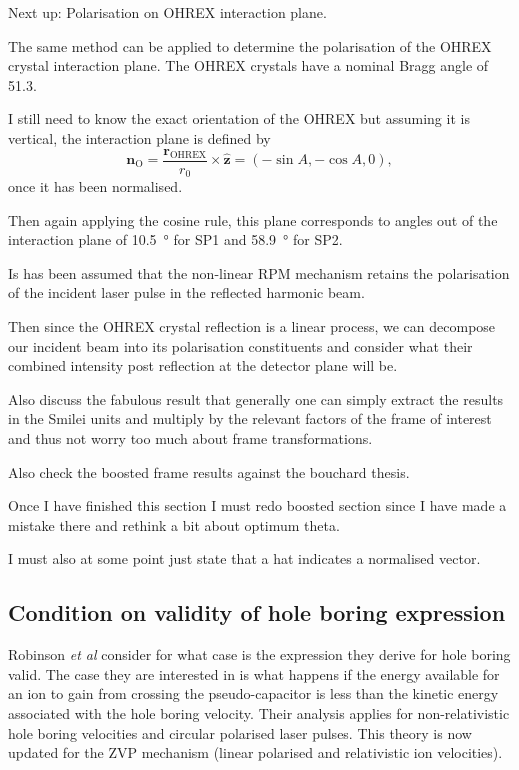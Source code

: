 Next up: Polarisation on OHREX interaction plane.

The same method can be applied to determine the polarisation of the OHREX crystal interaction plane. The OHREX crystals have a nominal Bragg angle of 51.3\degree.

I still need to know the exact orientation of the OHREX but assuming it is vertical, the interaction plane is defined by
\begin{equation}
	\mathbf{n}_\mathrm{O} =  \frac{\mathbf{r}_\mathrm{OHREX}}{r_0} \times \hat{\mathbf{z}}= (-\sin A, -\cos A, 0),
\end{equation}
once it has been normalised.

Then again applying the cosine rule, this plane corresponds to angles out of the interaction plane of \qty{10.5}{\degree} for SP1 and \qty{58.9}{\degree} for SP2.

Is has been assumed that the non-linear RPM mechanism retains the polarisation of the incident laser pulse in the reflected harmonic beam.

Then since the OHREX crystal reflection is a linear process, we can decompose our incident beam into its polarisation constituents and consider what their combined intensity post reflection at the detector plane will be.

Also discuss the fabulous result that generally one can simply extract the results in the Smilei units and multiply by the relevant factors of the frame of interest and thus not worry too much about frame transformations.

Also check the boosted frame results against the bouchard thesis.


Once I have finished this section I must redo boosted section since I have made a mistake there and rethink a bit about optimum theta.

I must also at some point just state that a hat indicates a normalised vector.




\subsection{Condition on validity of hole boring expression}
Robinson \textit{et al} \cite{robinsonHoleboringRadiationPressure2009} consider for what case is the expression they derive for hole boring valid. The case they are interested in is what happens if the energy available for an ion to gain from crossing the pseudo-capacitor is less than the kinetic energy associated with the hole boring velocity. Their analysis applies for non-relativistic hole boring velocities and circular polarised laser pulses. This theory is now updated for the ZVP mechanism (linear polarised and relativistic ion velocities).

